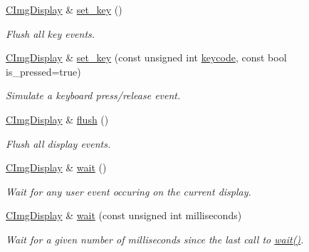 \begin{DoxyCompactItemize}
\hyperlink{structcimg__library__suffixed_1_1CImgDisplay}{C\+Img\+Display} \& \hyperlink{structcimg__library__suffixed_1_1CImgDisplay_a23693d0cc3adc326739bafdc0f3ad3ed}{set\+\_\+key} ()
\begin{DoxyCompactList}\small\item\em Flush all key events. \end{DoxyCompactList}\item 
\hyperlink{structcimg__library__suffixed_1_1CImgDisplay}{C\+Img\+Display} \& \hyperlink{structcimg__library__suffixed_1_1CImgDisplay_aaa2fe604fb2e3e2c3ab01b040fda6960}{set\+\_\+key} (const unsigned int \hyperlink{structcimg__library__suffixed_1_1CImgDisplay_a09c59cb4778b64e31884fccca321839b}{keycode}, const bool is\+\_\+pressed=true)
\begin{DoxyCompactList}\small\item\em Simulate a keyboard press/release event. \end{DoxyCompactList}\item 
\hyperlink{structcimg__library__suffixed_1_1CImgDisplay}{C\+Img\+Display} \& \hyperlink{structcimg__library__suffixed_1_1CImgDisplay_a260b55ecbe9f4648a045357f8906f3c7}{flush} ()
\begin{DoxyCompactList}\small\item\em Flush all display events. \end{DoxyCompactList}\item 
\mbox{\label{structcimg__library__suffixed_1_1CImgDisplay_a6ba54ea916f502d782ccb787ce02ccbd}} 
\hyperlink{structcimg__library__suffixed_1_1CImgDisplay}{C\+Img\+Display} \& \hyperlink{structcimg__library__suffixed_1_1CImgDisplay_a6ba54ea916f502d782ccb787ce02ccbd}{wait} ()
\begin{DoxyCompactList}\small\item\em Wait for any user event occuring on the current display. \end{DoxyCompactList}\item 
\hyperlink{structcimg__library__suffixed_1_1CImgDisplay}{C\+Img\+Display} \& \hyperlink{structcimg__library__suffixed_1_1CImgDisplay_a6a6bf6d5a43424d8e9728563dc79aa3f}{wait} (const unsigned int milliseconds)
\begin{DoxyCompactList}\small\item\em Wait for a given number of milliseconds since the last call to \hyperlink{structcimg__library__suffixed_1_1CImgDisplay_a6ba54ea916f502d782ccb787ce02ccbd}{wait()}. \end{DoxyCompactList}\item 

\end{DoxyCompactItemize}
